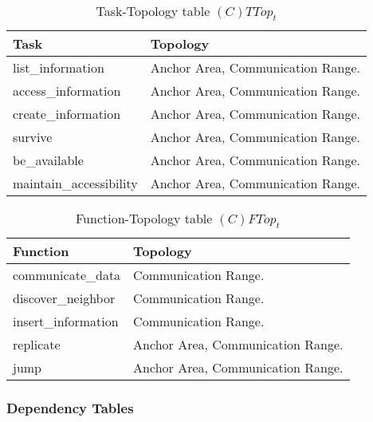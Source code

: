 \begin{table}[H]
	\centering
	\begin{tabular}{|p{4cm}|p{8cm}|}
			\hline
			\textbf{Task} & \textbf{Topology} \\
			\hline
			list\_information & Anchor Area, Communication Range. \\
			\hline
			access\_information& Anchor Area, Communication Range.\\
			\hline
			create\_information & Anchor Area, Communication Range.\\
			\hline
			survive & Anchor Area, Communication Range. \\
			\hline
			be\_available & Anchor Area, Communication Range. \\
			\hline
			maintain\_accessibility & Anchor Area, Communication Range. \\
			\hline
		\end{tabular}
		\caption{Task-Topology table $(C)TTop_t$}
	\label{tab:cttopt}
\end{table}

\begin{table}[H]
	\centering
	\begin{tabular}{|p{4cm}|p{8cm}|}
			\hline
			\textbf{Function} & \textbf{Topology} \\
			\hline
			communicate\_data & Communication Range.\\
			\hline
			discover\_neighbor & Communication Range.\\
			\hline
			insert\_information & Communication Range. \\
			\hline
			replicate & Anchor Area, Communication Range. \\
			\hline
			jump & Anchor Area, Communication Range. \\
			\hline
		\end{tabular}
	\caption{Function-Topology table $(C)FTop_t$}
	\label{tab:cftopt}
\end{table}


\subsubsection{Dependency Tables}

